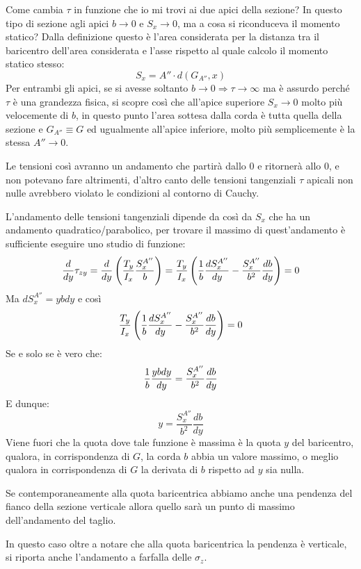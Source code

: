 \documentclass{article}
\begin{document}
\begin{adjustwidth}{2in}{}
		Come cambia $\tau$  in funzione che io mi trovi ai due apici della sezione? In questo tipo di sezione agli apici $b\rightarrow0$ e $S_x\rightarrow0$, ma a cosa si riconduceva il momento statico? Dalla definizione questo è l'area considerata per la distanza tra il baricentro dell'area considerata e l'asse rispetto al quale calcolo il momento statico stesso:
		\[S_x = A'' \cdot d(G_{A''}, x)\]
		Per entrambi gli apici, se si avesse soltanto $b\rightarrow0 \Rightarrow\tau\rightarrow\infty$ ma è assurdo perché $\tau$ è una grandezza fisica, si scopre così che all'apice superiore $S_x\rightarrow0$ molto più velocemente di $b$, in questo punto l'area sottesa dalla corda è tutta quella della sezione e $G_{A''}\equiv G$ ed ugualmente all'apice inferiore, molto più semplicemente è la stessa $A'' \rightarrow0$. \newline 
		
		Le tensioni così avranno un andamento che partirà dallo $0$ e ritornerà allo $0$, e non potevano fare altrimenti, d'altro canto delle tensioni tangenziali $\tau$ apicali non nulle avrebbero violato le condizioni al contorno di Cauchy. \newline 
		
		L'andamento delle tensioni tangenziali dipende da così da $S_x$ che ha un andamento quadratico/parabolico, per trovare il massimo di quest'andamento è sufficiente eseguire uno studio di funzione: 
		\[ {d\over dy}\tau_{zy} = {d\over dy}\left(\dfrac{T_y}{I_x}\dfrac{S_x^{A''}}{b}\right) = \dfrac{T_y}{I_x}\left( {1\over b}\dfrac{dS_x^{A''}}{dy} - \dfrac{S_x^{A''}}{b^2}\dfrac{db}{dy}\right) = 0\]
		Ma \( dS_x^{A''} = ybdy\) e così
		\[ \dfrac{T_y}{I_x}\left( {1\over b}\dfrac{dS_x^{A''}}{dy} - \dfrac{S_x^{A''}}{b^2}\dfrac{db}{dy}\right) = 0 \]
		Se e solo se è vero che:
		\[{1\over b}\dfrac{ybdy}{dy} = \dfrac{S_x^{A''}}{b^2}\dfrac{db}{dy}\]
		E dunque: 
		\[ y =  \dfrac{S_x^{A''}}{b^2}\dfrac{db}{dy}\]
		Viene fuori che la quota dove tale funzione è massima è la quota $y$ del baricentro, qualora, in corrispondenza di $G$, la corda $b$ abbia un valore massimo, o meglio qualora in corrispondenza di $G$ la derivata di $b$ rispetto ad $y$ sia nulla. 
		
		Se contemporaneamente alla quota baricentrica abbiamo anche una pendenza del fianco della sezione verticale allora quello sarà un punto di massimo dell'andamento del taglio. \newline 
		
		In questo caso oltre a notare che alla quota baricentrica la pendenza è verticale, si riporta anche l'andamento a farfalla delle $\sigma_z$. 
		

\end{adjustwidth}
\end{document}
